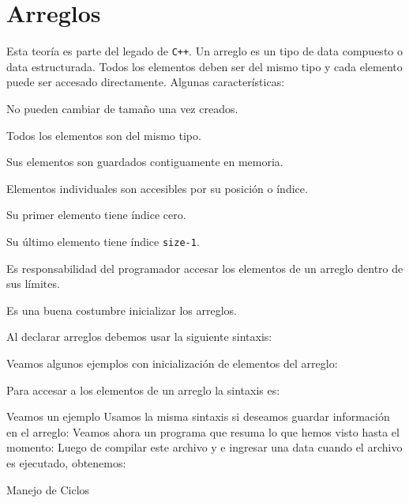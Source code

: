 \chapter{Arreglos}

Esta teoría es parte del legado de \texttt{C++}.
Un arreglo es un tipo de data compuesto o data estructurada.
Todos los elementos deben ser del mismo tipo y cada elemento puede ser accesado directamente.
Algunas características:

\begin{compactitem}
	\item No pueden cambiar de tamaño una vez creados.
	\item Todos los elementos son del mismo tipo.
	\item Sus elementos son guardados contiguamente en memoria.
	\item Elementos individuales son accesibles por su posición o índice.
	\item Su primer elemento tiene índice cero.
	\item Su último elemento tiene índice \texttt{size-1}.
	\item Es responsabilidad del programador accesar los elementos de un arreglo dentro de sus límites.
	\item Es una buena costumbre inicializar los arreglos.
\end{compactitem}

Al declarar arreglos debemos usar la siguiente sintaxis:
\begin{center}
\end{center}

Veamos algunos ejemplos con inicialización de elementos del arreglo:

Para accesar a los elementos de un arreglo la sintaxis es:
\begin{center}
\end{center}
Veamos un ejemplo
Usamos la misma sintaxis si deseamos guardar información en el arreglo:
Veamos ahora un programa que resuma lo que hemos visto hasta el momento:
Luego de compilar este archivo y e ingresar una data cuando el archivo es ejecutado, obtenemos:
\immediate{}

Manejo de Ciclos
